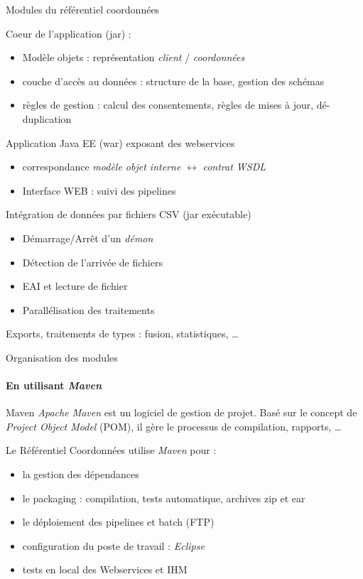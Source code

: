 \documentclass[compact]{beamer}%
\begin{document}
\begin{frame}{Modules du référentiel coordonnées}
	\begin{description}[<+->]
	\item[Core] Coeur de l'application (jar) :
		\begin{itemize}
		\item Modèle objets : représentation \emph{client} / \emph{coordonnées}
		\item couche d'accès au données : structure de la base, gestion des schémas
		\item règles de gestion : calcul des consentements, règles de mises à jour, dé-duplication
		\end{itemize}
	\item[Webservices] Application Java EE (war) exposant des webservices
		\begin{itemize}
		\item correspondance \emph{modèle objet interne} $\leftrightarrow$ \emph{contrat WSDL}
		\item Interface WEB : suivi des pipelines
		\end{itemize}
	\item[Pipelines] Intégration de données par fichiers CSV (jar exécutable)
		\begin{itemize}
		\item Démarrage/Arrêt d'un \emph{démon}
		\item Détection de l'arrivée de fichiers
		\item EAI et lecture de fichier
		\item Parallélisation des traitements
		\end{itemize}
	\item[Batch] Exports, traitements de types : fusion, statistiques, \dots
	\end{description}
\end{frame}


\begin{frame}{Organisation des modules}
	\framesubtitle{En utilisant \emph{Maven}}
	
	\begin{block}{Maven}
	\emph{Apache Maven} est un logiciel de gestion de projet. Basé sur le concept de \emph{Project Object Model} (POM), il gère le processus de compilation, rapports, \dots
	\end{block}
	
	\pause
	Le Référentiel Coordonnées utilise \emph{Maven} pour : 
	\begin{itemize}
	\item la gestion des dépendances
	\item le packaging : compilation, tests automatique, archives zip et ear
	\item le déploiement des pipelines et batch (FTP)
	\item configuration du poste de travail : \emph{Eclipse}
	\item tests en local des Webservices et IHM
	\end{itemize}

\end{frame}
\end{document}
